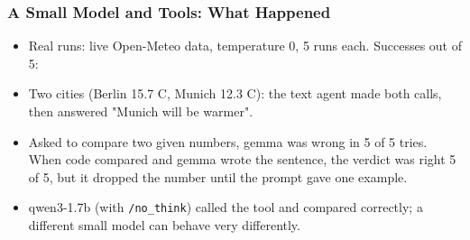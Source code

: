 \begin{frame}[fragile]\frametitle{A Small Model and Tools: What Happened}
      \begin{itemize}
        \item Real runs: live Open-Meteo data, temperature 0, 5 runs each. Successes out of 5:
      \end{itemize}
\begin{center}
\end{center}
      \begin{itemize}
        \item Two cities (Berlin 15.7 C, Munich 12.3 C): the text agent made both calls, then answered "Munich will be warmer".
        \item Asked to compare two given numbers, gemma was wrong in 5 of 5 tries. When code compared and gemma wrote the sentence, the verdict was right 5 of 5, but it dropped the number until the prompt gave one example.
        \item qwen3-1.7b (with \texttt{/no\_think}) called the tool and compared correctly; a different small model can behave very differently.
      \end{itemize}
\end{frame}

